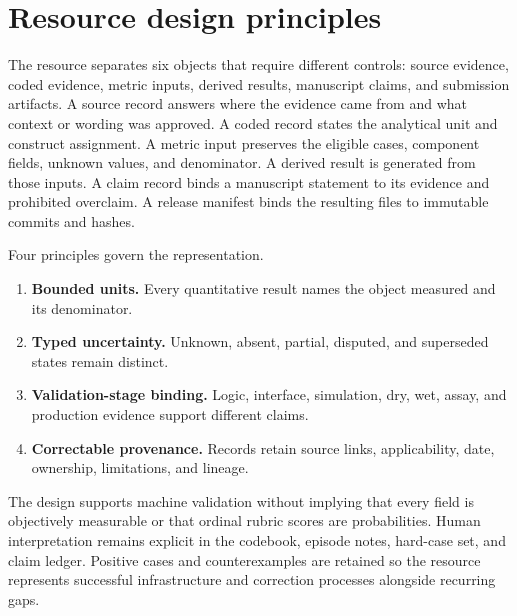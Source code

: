 \section{Resource design principles}

The resource separates six objects that require different controls: source evidence, coded evidence, metric inputs, derived results, manuscript claims, and submission artifacts. A source record answers where the evidence came from and what context or wording was approved. A coded record states the analytical unit and construct assignment. A metric input preserves the eligible cases, component fields, unknown values, and denominator. A derived result is generated from those inputs. A claim record binds a manuscript statement to its evidence and prohibited overclaim. A release manifest binds the resulting files to immutable commits and hashes.

Four principles govern the representation.
\begin{enumerate}
  \item \textbf{Bounded units.} Every quantitative result names the object measured and its denominator.
  \item \textbf{Typed uncertainty.} Unknown, absent, partial, disputed, and superseded states remain distinct.
  \item \textbf{Validation-stage binding.} Logic, interface, simulation, dry, wet, assay, and production evidence support different claims.
  \item \textbf{Correctable provenance.} Records retain source links, applicability, date, ownership, limitations, and lineage.
\end{enumerate}

The design supports machine validation without implying that every field is objectively measurable or that ordinal rubric scores are probabilities. Human interpretation remains explicit in the codebook, episode notes, hard-case set, and claim ledger. Positive cases and counterexamples are retained so the resource represents successful infrastructure and correction processes alongside recurring gaps.
